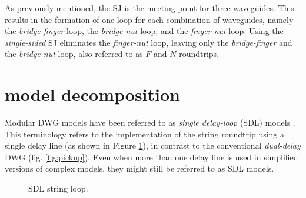 \documentclass{sigchi}
\begin{document}
As previously mentioned, the SJ is the meeting point for three waveguides.
This results in the formation of one loop for each combination of waveguides, namely the \textit{bridge-finger} loop, the \textit{bridge-nut} loop, and the \textit{finger-nut} loop.
Using the \textit{single-sided} SJ eliminates the \textit{finger-nut} loop, leaving only the \textit{bridge-finger} and the \textit{bridge-nut} loop, also referred to as $F$ and $N$ roundtrips.

\section{model decomposition}

Modular DWG models have been referred to as \textit{single delay-loop} (SDL) models \cite{karjalainen_plucked-string_1998,pakarinen_physical_2005}.
This terminology refers to the implementation of the string roundtrip using a single delay line (as shown in Figure \ref{fig:sdl_string_loop}), in contrast to the conventional \textit{dual-delay} DWG (fig. \ref{fig:pickup}).
Even when more than one delay line is used in simplified versions of complex models, they might still be referred to as SDL models.
\begin{figure}[h]
	\centering
	\scalebox{0.75}{}
	\caption{SDL string loop.}
	\label{fig:sdl_string_loop}
\end{figure}

\end{document}
